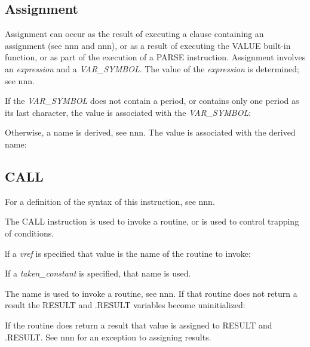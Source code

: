 \subsection{Assignment}\label{assignment}

Assignment can occur as the result of executing a clause containing an
assignment (see nnn and nnn), or as a result of executing the VALUE
built-in function, or as part of the execution of a PARSE instruction.
Assignment involves an \emph{expression} and a \emph{VAR\_SYMBOL}. The
value of the \emph{expression} is determined; see nnn.

If the \emph{VAR\_SYMBOL} does not contain a period, or contains only
one period as its last character, the value is associated with the
\emph{VAR\_SYMBOL}:



Otherwise, a name is derived, see nnn. The value is associated with the
derived name:



\subsection{CALL}\label{call}

For a definition of the syntax of this instruction, see nnn.

The CALL instruction is used to invoke a routine, or is used to control
trapping of conditions.

lf a \emph{vref} is specified that value is the name of the routine to
invoke:



If a \emph{taken\_constant} is specified, that name is used.



The name is used to invoke a routine, see nnn. If that routine does not
return a result the RESULT and .RESULT variables become uninitialized:



If the routine does return a result that value is assigned to RESULT and
.RESULT. See nnn for an exception to assigning results.

